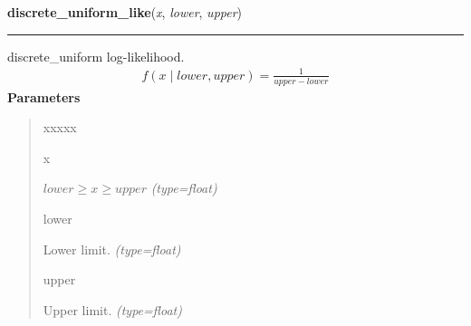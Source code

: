 \hspace{.8\funcindent}\begin{boxedminipage}{\funcwidth}

    \raggedright \textbf{discrete\_uniform\_like}(\textit{x}, \textit{lower}, \textit{upper})

    \vspace{-1.5ex}

    \rule{\textwidth}{0.5\fboxrule}
\setlength{\parskip}{2ex}

discrete{\_}uniform log-likelihood.
\begin{equation*}\begin{split}f(x \mid lower, upper) = \frac{1}{upper-lower}\end{split}\end{equation*}\setlength{\parskip}{1ex}
      \textbf{Parameters}
      \vspace{-1ex}

      \begin{quote}
        \begin{Ventry}{xxxxx}

          \item[x]


$lower \geq x \geq upper$
            {\it (type=float)}

          \item[lower]


Lower limit.
            {\it (type=float)}

          \item[upper]


Upper limit.
            {\it (type=float)}

        \end{Ventry}

      \end{quote}

    \end{boxedminipage}

    \label{pymc:distributions:exponential_like}

    \vspace{0.5ex}

